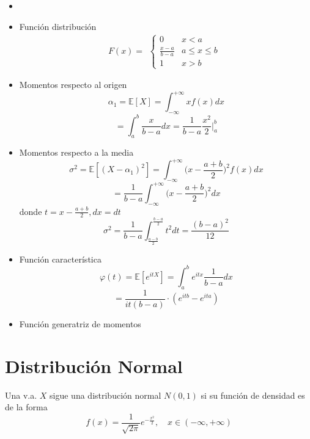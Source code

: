 \begin{prop}
  \begin{itemize}
    \item []
    \item Función distribución
      \[ 
        F(x) =
        \begin{aligned}
          \begin{cases}
            0 & x < a \\
            \frac{x-a}{b-a} & a \leq x \leq b \\
            1 & x > b
          \end{cases}
        \end{aligned} 
      \] 
    \item Momentos respecto al origen
      \[ 
        \alpha_{1} = \mathbb{E} [ X ] = \int_{- \infty}^{+ \infty} x f(x) dx 
      \] 
      \[ 
        = \int_{a}^{b} \frac{x}{b - a} dx = \frac{1}{b - a} \frac{x^{2}}{2} \Bigg |_{a}^{b} 
      \] 
    \item Momentos respecto a la media
      \[ 
        \sigma^{2} = \mathbb{E} [ (X -\alpha_{1})^{2} ] = \int_{- \infty}^{+ \infty} \Big ( x - \frac{a + b}{2} \Big )^{2} f(x) dx
      \] 
      \[ 
        = \frac{1}{b - a} \int_{- \infty}^{+ \infty} \Big ( x - \frac{a + b}{2} \Big )^{2} dx
      \] 
      donde $ t = x -\frac{a + b}{2}, dx = dt$
      \[ 
        \sigma^{2} = \frac{1}{b - a} \int_{\frac{a -b}{2}}^{\frac{b-a}{2}} t^{2} dt = \frac{(b - a)^{2}}{12} 
      \] 
    \item Función característica
      \[ 
        \varphi(t) = \mathbb{E} [ e^{itX} ] = \int_{a}^{b} e^{itx} \frac{1}{b - a} dx
      \] 
      \[ 
        = \frac{1}{it(b -a)} \cdot (e^{itb} - e^{ita}) 
      \] 
    \item Función generatriz de momentos
  \end{itemize}
\end{prop}

\section{Distribución Normal}

\begin{defn}
  Una v.a. $X$ sigue una distribución normal $N(0,1)$ si su función de densidad es de la forma
  \[ 
    f(x) = \frac{1}{\sqrt{2 \pi}} e^{- \frac{x^{2}}{2}}, \quad x \in (-\infty, + \infty)
  \] 
\end{defn}


